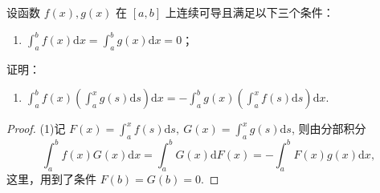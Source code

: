 \documentclass[lang=cn,12pt]{elegantbook}
\begin{document}
\vspace{1em}

\begin{example}
   设函数 $f(x),g(x)$ 在 $[a,b]$ 上连续可导且满足以下三个条件：
    \begin{enumerate}
        \item[(i)] $\displaystyle \int_{a}^{b} f(x) \mathrm{d}x = \int_{a}^{b} g(x) \mathrm{d}x = 0$；
    \end{enumerate}
    证明：
    \begin{enumerate}
        \item[(1)] $\displaystyle \int_{a}^{b} f(x) \left( \int_{a}^{x} g(s) \mathrm{d}s \right) \mathrm{d}x = - \int_{a}^{b} g(x) \left( \int_{a}^{x} f(s) \mathrm{d}s \right) \mathrm{d}x$.
    \end{enumerate}
\end{example}

\begin{proof}
(1)记 $\displaystyle F(x) = \int_{a}^{x} f(s) \mathrm{d}s,\ G(x) = \int_{a}^{x} g(s) \mathrm{d}s$, 则由分部积分
\[
\int_{a}^{b} f(x)G(x) \mathrm{d}x = \int_{a}^{b} G(x) \mathrm{d}F(x) = - \int_{a}^{b} F(x)g(x) \mathrm{d}x,
\]
这里，用到了条件 $F(b)=G(b)=0$.
\end{proof}



\end{document}
